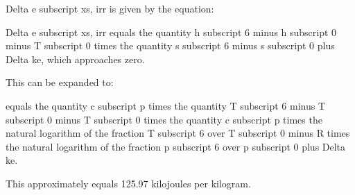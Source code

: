 Delta e subscript xs, irr is given by the equation:

Delta e subscript xs, irr equals the quantity h subscript 6 minus h subscript 0 minus T subscript 0 times the quantity s subscript 6 minus s subscript 0 plus Delta ke, which approaches zero.

This can be expanded to:

equals the quantity c subscript p times the quantity T subscript 6 minus T subscript 0 minus T subscript 0 times the quantity c subscript p times the natural logarithm of the fraction T subscript 6 over T subscript 0 minus R times the natural logarithm of the fraction p subscript 6 over p subscript 0 plus Delta ke.

This approximately equals 125.97 kilojoules per kilogram.